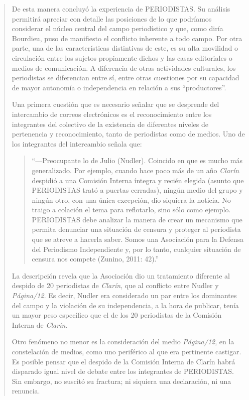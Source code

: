 \begin{quote}
De esta manera concluyó la experiencia de PERIODISTAS. Su análisis permitirá apreciar con detalle las posiciones de lo que podríamos considerar el núcleo central del campo periodístico y que, como diría Bourdieu, puso de manifiesto el conflicto inherente a todo campo. Por otra parte, una de las características distintivas de este, es su alta movilidad o circulación entre los sujetos propiamente dichos y las casas editoriales o medios de comunicación. A diferencia de otras actividades culturales, los periodistas se diferencian entre sí, entre otras cuestiones por su capacidad de mayor autonomía o independencia en relación a sus ``productores''.

Una primera cuestión que es necesario señalar que se desprende del intercambio de correos electrónicos es el reconocimiento entre los integrantes del colectivo de la existencia de diferentes niveles de pertenencia y reconocimiento, tanto de periodistas como de medios. Uno de los integrantes del intercambio señala que:

\begin{quote}
	\enquote{---Preocupante lo de Julio (Nudler). Coincido en que es mucho más generalizado. Por ejemplo, cuando hace poco más de un año \emph{Clarín }despidió a una Comisión Interna íntegra y recién elegida (asunto que PERIODISTAS trató a puertas cerradas), ningún medio del grupo y ningún otro, con una única excepción, dio siquiera la noticia. No traigo a colación el tema para reflotarlo, sino sólo como ejemplo. PERIODISTAS debe analizar la manera de crear un mecanismo que permita denunciar una situación de censura y proteger al periodista que se atreve a hacerla saber. Somos una Asociación para la Defensa del Periodismo Independiente y, por lo tanto, cualquier situación de censura nos compete (Zunino, 2011: 42).}
\end{quote}


La descripción revela que la Asociación dio un tratamiento diferente al despido de 20 periodistas de \emph{Clarín}, que al conflicto entre Nudler y \emph{Página/12}. Es decir, Nudler era considerado un par entre los dominantes del campo y la violación de su independencia, a la hora de publicar, tenía un mayor peso específico que el de los 20 periodistas de la Comisión Interna de \emph{Clarín}.

Otro fenómeno no menor es la consideración del medio \emph{Página/12}, en la constelación de medios, como uno periférico al que era pertinente castigar. Es posible pensar que el despido de la Comisión Interna de Clarín habrá disparado igual nivel de debate entre los integrantes de PERIODISTAS. Sin embargo, no suscitó su fractura; ni siquiera una declaración, ni una renuncia.


\end{quote}
